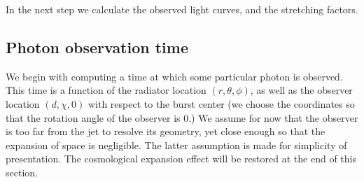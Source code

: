 \documentclass{article}
\begin{document}
In the next step we calculate the observed light curves, and the
stretching factors.

\subsection{Photon observation time}

We begin with computing a time at which some particular photon is
observed. This time is a function of the radiator location $\left(r,
\theta, \phi\right)$, as well as the observer location $\left(d, \chi,
0\right)$ with respect to the burst center (we choose the coordinates
so that the rotation angle of the observer is $0$.) We assume for now
that the observer is too far from the jet to resolve its geometry, yet
close enough so that the expansion of space is negligible. The latter
assumption is made for simplicity of presentation. The cosmological
expansion effect will be restored at the end of this section.
\end{document}
